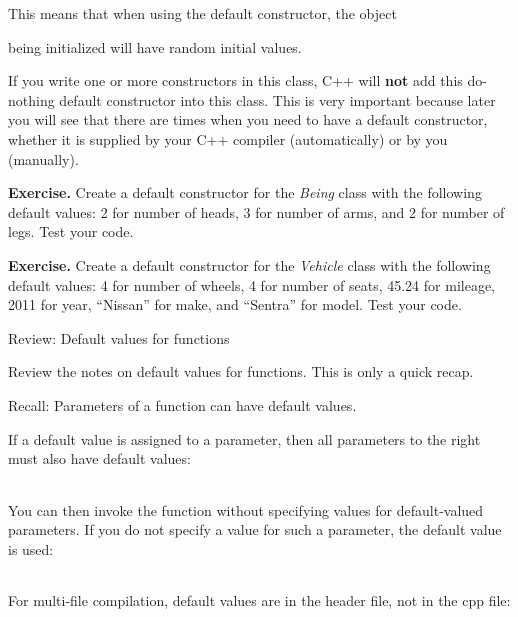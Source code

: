 \documentclass[
]{article}
\begin{document}
This means that when using the default constructor, the object

being initialized will have random initial values.

If you write one or more constructors in this class, C++ will
\textbf{not} add this do-nothing default constructor into this class.
This is very important because later you will see that there are times
when you need to have a default constructor, whether it is supplied by
your C++ compiler (automatically) or by you (manually).

\textbf{Exercise.} Create a default constructor for the \emph{Being}
class with the following default values: 2 for number of heads, 3 for
number of arms, and 2 for number of legs. Test your code.

\textbf{Exercise.} Create a default constructor for the \emph{Vehicle}
class with the following default values: 4 for number of wheels, 4 for
number of seats, 45.24 for mileage, 2011 for year, ``Nissan'' for make,
and ``Sentra'' for model. Test your code.

Review: Default values for functions

Review the notes on default values for functions. This is only a quick
recap.

Recall: Parameters of a function can have default values.

If a default value is assigned to a parameter, then all parameters to
the right must also have default values:

\begin{longtable}[]{@{}@{}}
\toprule
\endhead
\bottomrule
\end{longtable}

You can then invoke the function without specifying values for
default-valued parameters. If you do not specify a value for such a
parameter, the default value is used:

\begin{longtable}[]{@{}@{}}
\toprule
\endhead
\bottomrule
\end{longtable}

For multi-file compilation, default values are in the header file, not
in the cpp file:

\begin{longtable}[]{@{}@{}}
\toprule
\endhead
\bottomrule
\end{longtable}

\begin{longtable}[]{@{}@{}}
\toprule
\endhead
\bottomrule
\end{longtable}
\end{document}
